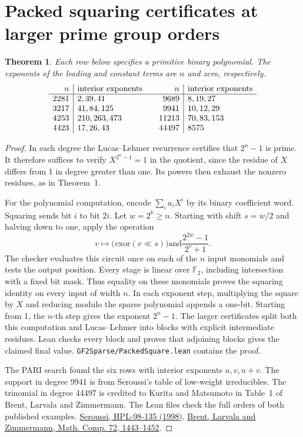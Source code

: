 \documentclass[11pt]{article}
\newtheorem{theorem}{Theorem}
\newcommand{\F}{\mathbb F_2}
\begin{document}
\section{Packed squaring certificates at larger prime group orders}\label{sec:packed}
\begin{theorem}\label{thm:packed}
Each row below specifies a primitive binary polynomial. The exponents
of the leading and constant terms are \(n\) and zero, respectively.
\[
\begin{array}{r|l@{\qquad}r|l}
 n & \text{interior exponents} & n & \text{interior exponents}\\ \hline
 2281 & 2,39,41 & 9689  & 8,19,27\\
 3217 & 41,84,125 & 9941  & 10,12,29\\
 4253 & 210,263,473 & 11213 & 70,83,153\\
 4423 & 17,26,43 & 44497 & 8575
\end{array}
\]
\end{theorem}
\begin{proof}
In each degree the Lucas--Lehmer recurrence certifies that \(2^n-1\)
is prime. It therefore suffices to verify \(X^{2^n-1}=1\) in the
quotient, since the residue of \(X\) differs from 1 in degree greater
than one. Its powers then exhaust the nonzero residues, as in Theorem~1.

For the polynomial computation, encode \(\sum_i a_iX^i\) by its
binary coefficient word. Squaring sends bit \(i\) to bit \(2i\).
Let \(w=2^k\ge n\). Starting with shift \(s=w/2\) and halving down
to one, apply the operation
\[
    v\longmapsto \bigl(v\mathbin{\mathrm{xor}}(v\ll s)\bigr)
             \mathbin{\mathrm{and}}\frac{2^{2w}-1}{2^s+1}.
\]
The checker evaluates this circuit once on each of the \(n\) input
monomials and tests the output position. Every stage is linear over
\(\F\), including intersection with a fixed bit mask. Thus equality on
these monomials proves the squaring identity on every input of width
\(n\). In each exponent step, multiplying the square by \(X\) and
reducing modulo the sparse polynomial appends a one-bit. Starting
from 1, the \(n\)-th step gives the exponent \(2^n-1\). The larger
certificates split both this computation and Lucas--Lehmer into
blocks with explicit intermediate residues. Lean checks every block
and proves that adjoining blocks gives the claimed final value.
\nolinkurl{GF2Sparse/PackedSquare.lean} contains the proof.

The PARI search found the six rows with interior exponents \(u,v,u+v\).
The support in degree 9941 is from Seroussi's table of low-weight
irreducibles. The trinomial in degree 44497 is credited to Kurita
and Matsumoto in Table~1 of Brent, Larvala and Zimmermann.
The Lean files check the full orders of both published examples.
\href{https://shiftleft.com/mirrors/www.hpl.hp.com/techreports/98/HPL-98-135.pdf}{Seroussi, HPL-98-135 (1998)}.
\href{https://maths-people.anu.edu.au/~brent/pd/rpb199.pdf}{Brent, Larvala and Zimmermann, Math. Comp. 72, 1443--1452}.
\end{proof}
\end{document}
